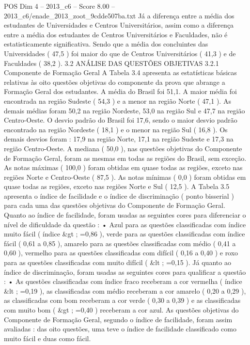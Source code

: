 \begin{textsample}{POS Dim 4 – 2013\_c6 – Score 8.00 – 2013\_c6/enade\_2013\_zoot\_9cdde507ba.txt}
Já a diferença entre a média dos estudantes de Universidades e Centros Universitários, assim como a diferença entre a média dos estudantes de Centros Universitários e Faculdades, não é estatisticamente significativa.
Sendo que a média dos concluintes das Universidades ( 47,5 ) foi maior do que de Centros Universitários ( 41,3 ) e de Faculdades ( 38,2 ). 3.2 ANÁLISE DAS QUESTÕES OBJETIVAS 3.2.1 Componente de Formação Geral A Tabela 3.4 apresenta as estatísticas básicas relativas às oito questões objetivas do componente da prova que abrange a Formação Geral dos estudantes.
A média do Brasil foi 51,1.
A maior média foi encontrada na região Sudeste ( 54,3 ) e a menor na região Norte ( 47,1 ).
As demais médias foram 50,2 na região Nordeste, 53,0 na região Sul e 47,7 na região Centro-Oeste.
O desvio padrão do Brasil foi 17,6, sendo o maior desvio padrão encontrado na região Nordeste ( 18,1 ) e o menor na região Sul ( 16,8 ).
Os demais desvios foram : 17,9 na região Norte, 17,1 na região Sudeste e 17,3 na região Centro-Oeste.
A mediana ( 50,0 ), nas questões objetivas do Componente de Formação Geral, foram as mesmas em todas as regiões do Brasil, sem exceção.
As notas máximas ( 100,0 ) foram obtidas em quase todas as regiões, exceto nas regiões Norte e Centro-Oeste ( 87,5 ).
As notas mínimas ( 0,0 ) foram obtidas em quase todas as regiões, exceto nas regiões Norte e Sul ( 12,5 ).
A Tabela 3.5 apresenta o índice de facilidade e o índice de discriminação ( ponto bisserial ) para cada uma das questões objetivas do Componente de Formação Geral.
Quanto ao índice de facilidade, foram usadas as seguintes cores para diferenciar o nível de dificuldade da questão : • Azul para as questões classificadas com índice muito fácil ( índice \&gt ; =0,86 ), verde para as questões classificadas com índice fácil ( 0,61 a 0,85 ), amarelo para as questões classificadas com médio ( 0,41 a 0,60 ), vermelho para as questões classificadas com difícil ( 0,16 a 0,40 ) e roxo para as questões classificadas com muito difícil ( \&lt ; =0,15 ).
Já quanto ao índice de discriminação, foram usadas as seguintes cores para qualificar a questão : • As questões classificadas com índice fraco receberam a cor vermelha ( índice \&lt ; =0,19 ), as classificadas com médio receberam a cor amarelo ( 0,20 a 0,29 ), as classificadas com bom receberam a cor verde ( 0,30 a 0,39 ) e as classificadas com muito bom ( \&gt ; =0,40 ) receberam a cor azul.
As questões objetivas do Componente de Formação Geral, segundo o índice de facilidade, foram assim avaliadas : das oito questões, uma teve o índice de facilidade classificado como muito fácil e duas como fácil.

\end{textsample}
